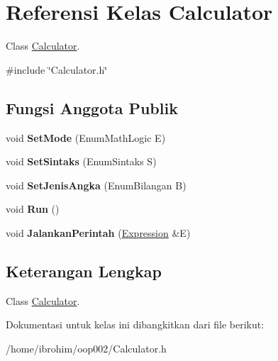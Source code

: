 \hypertarget{classCalculator}{}\section{Referensi Kelas Calculator}
\label{classCalculator}


Class \hyperlink{classCalculator}{Calculator}.  




{\ttfamily \#include \char`\"{}Calculator.\+h\char`\"{}}

\subsection*{Fungsi Anggota Publik}
\begin{DoxyCompactItemize}
\item 
\hypertarget{classCalculator_ae44c9d4718f5e901f0722d51640f1a56}{}void {\bfseries Set\+Mode} (Enum\+Math\+Logic E)\label{classCalculator_ae44c9d4718f5e901f0722d51640f1a56}

\item 
\hypertarget{classCalculator_ae732b97000a76b09cdd877eb41076898}{}void {\bfseries Set\+Sintaks} (Enum\+Sintaks S)\label{classCalculator_ae732b97000a76b09cdd877eb41076898}

\item 
\hypertarget{classCalculator_ae80cd6d1c2a226403d8382b4ca299b8f}{}void {\bfseries Set\+Jenis\+Angka} (Enum\+Bilangan B)\label{classCalculator_ae80cd6d1c2a226403d8382b4ca299b8f}

\item 
\hypertarget{classCalculator_a7fe790b3f7584808f01440946e515e4f}{}void {\bfseries Run} ()\label{classCalculator_a7fe790b3f7584808f01440946e515e4f}

\item 
\hypertarget{classCalculator_aae2ad7e2c24d9aebf745d37d7b80fa00}{}void {\bfseries Jalankan\+Perintah} (\hyperlink{classExpression}{Expression} \&E)\label{classCalculator_aae2ad7e2c24d9aebf745d37d7b80fa00}

\end{DoxyCompactItemize}


\subsection{Keterangan Lengkap}
Class \hyperlink{classCalculator}{Calculator}. 

Dokumentasi untuk kelas ini dibangkitkan dari file berikut\+:\begin{DoxyCompactItemize}
\item 
/home/ibrohim/oop002/Calculator.\+h\end{DoxyCompactItemize}
